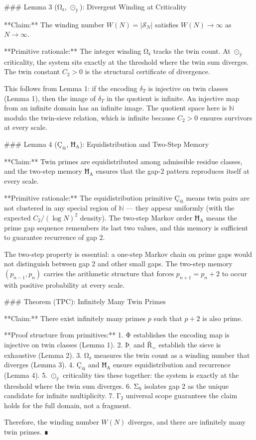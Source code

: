 ### Lemma 3 ($\mathrm{Ω}_{\mathrm{z}}$, $⊙_{ÿ}$): Divergent Winding at Criticality

**Claim:** The winding number $W(N) = |\mathcal{S}_N|$ satisfies $W(N) \to \infty$ as $N \to \infty$.

**Primitive rationale:** The integer winding $\mathrm{Ω}_{\mathrm{z}}$ tracks the twin count. At $⊙_{ÿ}$ criticality, the system sits exactly at the threshold where the twin sum diverges. The twin constant $C_2 > 0$ is the structural certificate of divergence.

This follows from Lemma 1: if the encoding $\delta_T$ is injective on twin classes (Lemma 1), then the image of $\delta_T$ in the quotient is infinite. An injective map from an infinite domain has an infinite image. The quotient space here is $\mathbb{N}$ modulo the twin-sieve relation, which is infinite because $C_2 > 0$ ensures survivors at every scale.

### Lemma 4 ($\mathrm{Ç}_{\mathrm{@}}$, $\mathrm{Ħ}_{\mathrm{A}}$): Equidistribution and Two-Step Memory

**Claim:** Twin primes are equidistributed among admissible residue classes, and the two-step memory $\mathrm{Ħ}_{\mathrm{A}}$ ensures that the gap-2 pattern reproduces itself at every scale.

**Primitive rationale:** The equidistribution primitive $\mathrm{Ç}_{\mathrm{@}}$ means twin pairs are not clustered in any special region of $\mathbb{N}$ — they appear uniformly (with the expected $C_2/(\log N)^2$ density). The two-step Markov order $\mathrm{Ħ}_{\mathrm{A}}$ means the prime gap sequence remembers its last two values, and this memory is sufficient to guarantee recurrence of gap 2.

The two-step property is essential: a one-step Markov chain on prime gaps would not distinguish between gap 2 and other small gaps. The two-step memory $(p_{n-1}, p_n)$ carries the arithmetic structure that forces $p_{n+1} = p_n + 2$ to occur with positive probability at every scale.

### Theorem (TPC): Infinitely Many Twin Primes

**Claim:** There exist infinitely many primes $p$ such that $p+2$ is also prime.

**Proof structure from primitives:**
1. $\mathrm{Φ}_{\mathrm{}}$ establishes the encoding map is injective on twin classes (Lemma 1).
2. $\mathrm{Þ}_{\mathrm{;}}$ and $\mathrm{Ř}_{\mathrm{=}}$ establish the sieve is exhaustive (Lemma 2).
3. $\mathrm{Ω}_{\mathrm{z}}$ measures the twin count as a winding number that diverges (Lemma 3).
4. $\mathrm{Ç}_{\mathrm{@}}$ and $\mathrm{Ħ}_{\mathrm{A}}$ ensure equidistribution and recurrence (Lemma 4).
5. $⊙_{ÿ}$ criticality ties these together: the system is exactly at the threshold where the twin sum diverges.
6. $\mathrm{Σ}_{\mathrm{S}}$ isolates gap 2 as the unique candidate for infinite multiplicity.
7. $\mathrm{Γ}_{\mathrm{ʔ}}$ universal scope guarantees the claim holds for the full domain, not a fragment.

Therefore, the winding number $W(N)$ diverges, and there are infinitely many twin primes. ∎
